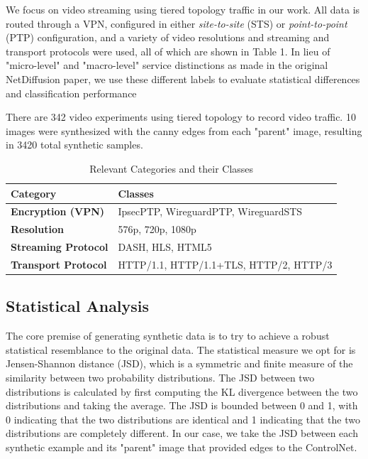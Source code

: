 \documentclass[sigconf, nonacm]{acmart}
\begin{document}
We focus on video streaming
using tiered topology traffic in our work. All data is routed through a VPN, configured
in either \textit{site-to-site} (STS) or \textit{point-to-point} (PTP) 
configuration, and a variety of video resolutions and streaming and transport
protocols were used, all of which are shown in Table 1. In lieu of "micro-level" 
and "macro-level" service distinctions as made in the original NetDiffusion paper, 
we use these different labels to evaluate statistical differences and
classification performance 

There are 342 video experiments using tiered topology to record video traffic. 10
images were synthesized with the canny edges from each "parent" image, resulting in 
3420 total synthetic samples.

\begin{table}[h!]
    \centering
    \begin{tabular}{@{}ll@{}}
      \midrule
    \textbf{Category} & \textbf{Classes} \\ \midrule
    \textbf{Encryption (VPN)} & {IpsecPTP, WireguardPTP, WireguardSTS} \\
    \textbf{Resolution} & 576p, 720p, 1080p \\
    \textbf{Streaming Protocol} & DASH, HLS, HTML5 \\
    \textbf{Transport Protocol} & HTTP/1.1, HTTP/1.1+TLS, HTTP/2, HTTP/3  \\
    \bottomrule
    \end{tabular}
    \caption{Relevant Categories and their Classes}
    \label{tab:config_features}
\end{table}

\subsection{Statistical Analysis}
The core premise of generating synthetic data is to try to achieve a robust
statistical resemblance to the original data. The statistical measure we opt 
for is Jensen-Shannon distance (JSD), which is a symmetric and finite measure of
the similarity between two probability distributions. The JSD between two distributions
is calculated by first computing the KL divergence between the two distributions and 
taking the average. The JSD is bounded between 0 and 1, with
0 indicating that the two distributions are identical and 1 indicating that the
two distributions are completely different. In our case, we take the JSD between each
synthetic example and its "parent" image that provided edges to the ControlNet.
\end{document}
